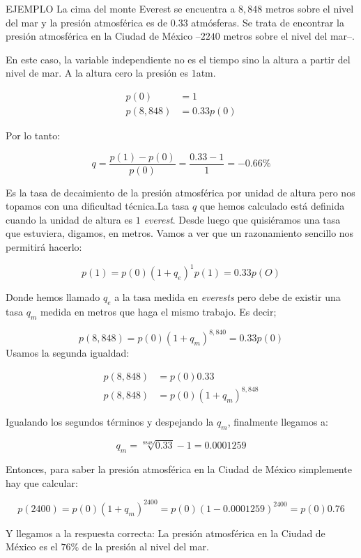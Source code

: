 \begin{exe}
\ex EJEMPLO
\noindent  La cima del monte Everest se encuentra a $8,848$ metros sobre el nivel del mar y la presión atmosférica es de $0.33$ atmósferas. Se trata de encontrar la presión atmosférica en la Ciudad de México --$2240$ metros sobre el nivel del mar--.

En este caso, la variable independiente no es el tiempo sino la altura a partir del nivel de mar. A la altura cero la presión es $1$atm. 

\begin{align*}
  p(0) &= 1 \\
  p(8,848) &= 0.33p(0)
\end{align*}

Por lo tanto:

\[
q=\dfrac{p(1)-p(0)}{p(0)}=\dfrac{0.33-1}{1}=-0.66\%
\]

Es la tasa de decaimiento de la presión atmosférica por unidad de altura pero nos topamos con una dificultad técnica.La tasa $q$ que hemos calculado está definida cuando la unidad de altura es $1$ \emph{everest}. Desde luego que quisiéramos una tasa que estuviera, digamos, en metros. Vamos a ver que un razonamiento sencillo nos permitirá hacerlo:

\[
p(1)=p(0)(1+q_e)^1
p(1)=0.33p(O)
\]

Donde hemos llamado $q_e$ a la tasa medida en \emph{everests} pero debe de existir una tasa $q_m$ medida en metros que haga el mismo trabajo. Es decir;

\[
p(8,848)=p(0)(1+q_m)^{8,840}=0.33p(0)
\]
Usamos la segunda igualdad:


\begin{align*}
p(8,848) &=p(0)0.33\\
p(8,848) &=p(0)(1+q_m)^{8,848}
\end{align*}

Igualando los segundos términos y despejando la $q_m$, finalmente llegamos a:

\[
q_m=\sqrt[8848]{0.33}-1=0.0001259
\]



 Entonces, para saber la presión atmosférica en la Ciudad de México simplemente hay que calcular:

\[
p(2400)=p(0)(1+q_m)^{2400}=p(0)(1-0.0001259)^{2400}=p(0)0.76
\]

Y llegamos a la respuesta correcta: La presión atmosférica en la Ciudad de México es el $76\%$ de la presión al nivel del mar.

\end{exe}




